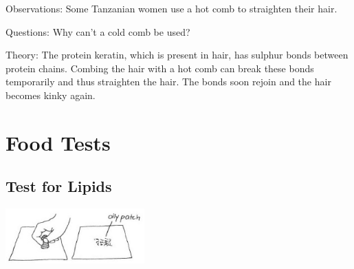 \begin{multicols}{2}
\begin{description*}
\item[Observations:]{Some Tanzanian women use a hot comb to straighten their hair.}
\item[Questions:]{Why can't a cold comb be used?}
\item[Theory:]{The protein keratin, which is present in hair, has sulphur bonds between protein chains.
Combing the hair with a hot comb can break these bonds temporarily and thus straighten the
hair. The bonds soon rejoin and the hair becomes kinky again.}
\end{description*}


\section*{Food Tests}


\subsection{Test for Lipids} %

\begin{center}
\includegraphics[width=0.4\textwidth]{./img/vso/food-test-lipids.jpg}
\end{center}


\end{multicols}
